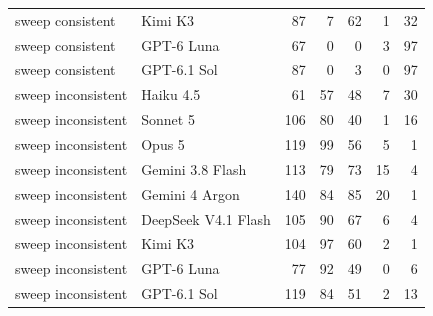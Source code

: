 \begin{tabular}{llrrrrr}
sweep consistent & Kimi K3 & 87 & 7 & 62 & 1 & 32 \\
sweep consistent & GPT-6 Luna & 67 & 0 & 0 & 3 & 97 \\
sweep consistent & GPT-6.1 Sol & 87 & 0 & 3 & 0 & 97 \\
sweep inconsistent & Haiku 4.5 & 61 & 57 & 48 & 7 & 30 \\
sweep inconsistent & Sonnet 5 & 106 & 80 & 40 & 1 & 16 \\
sweep inconsistent & Opus 5 & 119 & 99 & 56 & 5 & 1 \\
sweep inconsistent & Gemini 3.8 Flash & 113 & 79 & 73 & 15 & 4 \\
sweep inconsistent & Gemini 4 Argon & 140 & 84 & 85 & 20 & 1 \\
sweep inconsistent & DeepSeek V4.1 Flash & 105 & 90 & 67 & 6 & 4 \\
sweep inconsistent & Kimi K3 & 104 & 97 & 60 & 2 & 1 \\
sweep inconsistent & GPT-6 Luna & 77 & 92 & 49 & 0 & 6 \\
sweep inconsistent & GPT-6.1 Sol & 119 & 84 & 51 & 2 & 13 \\
\bottomrule
\end{tabular}
